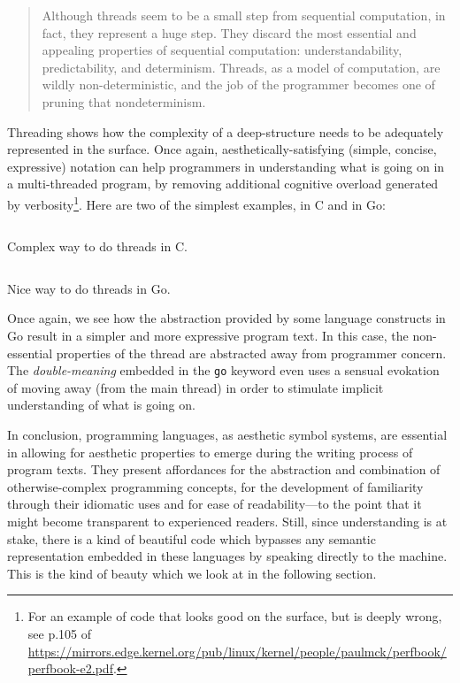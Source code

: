 \begin{quote}
  Although threads seem to be a small step from sequential computation, in fact, they represent a huge step. They discard the most essential and appealing properties of sequential computation: understandability, predictability, and determinism. Threads, as a model of computation, are wildly non-deterministic, and the job of the programmer becomes one of pruning that nondeterminism\citep{lee_problem_2006}.
\end{quote}

Threading shows how the complexity of a deep-structure needs to be adequately represented in the surface. Once again, aesthetically-satisfying (simple, concise, expressive) notation can help programmers in understanding what is going on in a multi-threaded program, by removing additional cognitive overload generated by verbosity\footnote{For an example of code that looks good on the surface, but is deeply wrong, see p.105 of \url{https://mirrors.edge.kernel.org/pub/linux/kernel/people/paulmck/perfbook/perfbook-e2.pdf}.}. Here are two of the simplest examples, in C and in Go:

\begin{listing}
  \inputminted{python}{./corpus/thread.c}
  \caption{Complex way to do threads in C.}
  \label{code:threading-c}
\end{listing}

\begin{listing}
  \inputminted{python}{./corpus/thread.go}
  \caption{Nice way to do threads in Go.}
  \label{code:threading-go}
\end{listing}

Once again, we see how the abstraction provided by some language constructs in Go result in a simpler and more expressive program text. In this case, the non-essential properties of the thread are abstracted away from programmer concern. The \emph{double-meaning} embedded in the \lstinline{go} keyword even uses a sensual evokation of moving away (from the main thread) in order to stimulate implicit understanding of what is going on.

In conclusion, programming languages, as aesthetic symbol systems, are essential in allowing for aesthetic properties to emerge during the writing process of program texts. They present affordances for the abstraction and combination of otherwise-complex programming concepts, for the development of familiarity through their idiomatic uses and for ease of readability—to the point that it might become transparent to experienced readers. Still, since understanding is at stake, there is a kind of beautiful code which bypasses any semantic representation embedded in these languages by speaking directly to the machine. This is the kind of beauty which we look at in the following section.

